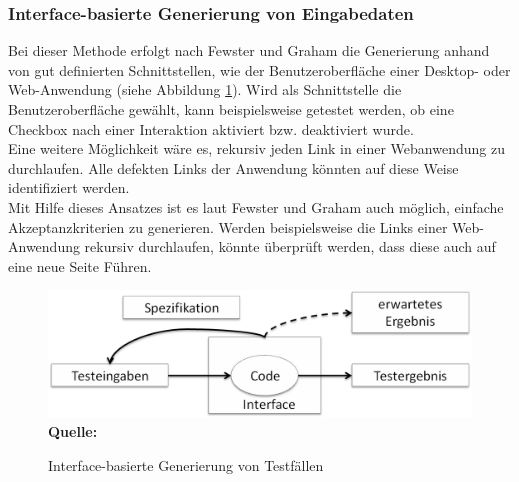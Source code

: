 \subsubsection{Interface-basierte Generierung von Eingabedaten}
\label{subsubsec:interfacebasierte_generierung}
Bei dieser Methode erfolgt nach Fewster und Graham \cite[vgl. S. 20]{fewster_software_1999} die Generierung anhand von gut definierten Schnittstellen, wie der Benutzeroberfläche einer Desktop- oder Web-Anwendung (siehe Abbildung \ref{fig:interfaceBasedDesign}). 
Wird als Schnittstelle die Benutzeroberfläche gewählt, kann beispielsweise getestet werden, ob eine Checkbox nach einer Interaktion aktiviert bzw. deaktiviert wurde.\\
Eine weitere Möglichkeit wäre es, rekursiv jeden Link in einer Webanwendung zu durchlaufen. Alle defekten Links der Anwendung könnten auf diese Weise identifiziert werden.\\
Mit Hilfe dieses Ansatzes ist es laut Fewster und Graham \cite[vgl. S. 21]{fewster_software_1999} auch möglich, einfache Akzeptanzkriterien zu generieren. Werden beispielsweise die Links einer Web-Anwendung rekursiv durchlaufen, könnte überprüft werden, dass diese auch auf eine neue Seite Führen. 

\begin{figure}[htb]
  \centering  
  \includegraphics[scale=0.6]{img/interfaceBasedDesign.png}\\
  \footnotesize\sffamily\textbf{Quelle:} \cite[vgl. S. 20]{fewster_software_1999}
  \caption{Interface-basierte Generierung von Testfällen}
  \label{fig:interfaceBasedDesign}
\end{figure}


